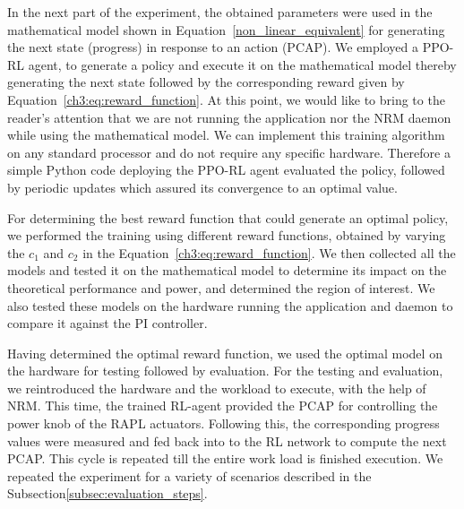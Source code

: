 
In the next part  of the experiment, the obtained parameters were used in the mathematical model shown in Equation~\ref{non_linear_equivalent} for generating the next state (progress) in response to an action (PCAP). We employed a PPO-RL agent, to generate a policy and execute it on the mathematical model thereby generating the next state followed by the corresponding reward given by Equation~\ref{ch3:eq:reward_function}. At this point, we would like to bring to the reader's attention that we are not running the application nor the NRM daemon while using the mathematical model. We can implement this training algorithm on any standard processor and do not require any specific hardware. Therefore a simple Python code deploying the PPO-RL agent evaluated the policy, followed by periodic updates which assured its convergence to an optimal value. 

For determining the best reward function that could generate an optimal policy, we performed the training using different reward functions, obtained by varying the $c_1$ and $c_2$ in the Equation~\ref{ch3:eq:reward_function}. We then collected all the models and tested it on the mathematical model to determine its impact on the theoretical performance and power, and determined the region of interest. We also tested these models on the hardware running the application and daemon to compare it against the PI controller.

Having determined the optimal reward function, we used the optimal model on the hardware for testing followed by evaluation.
For the testing and evaluation, we reintroduced the hardware and the workload to execute, with the help of NRM. This time, the trained RL-agent provided the PCAP for controlling the power knob of the RAPL actuators. Following this, the corresponding progress values were measured  and fed back into to the RL network to compute the next PCAP. This cycle is repeated till the entire work load is finished execution. 
We repeated the experiment for a variety of scenarios described in the Subsection\ref{subsec:evaluation_steps}.

